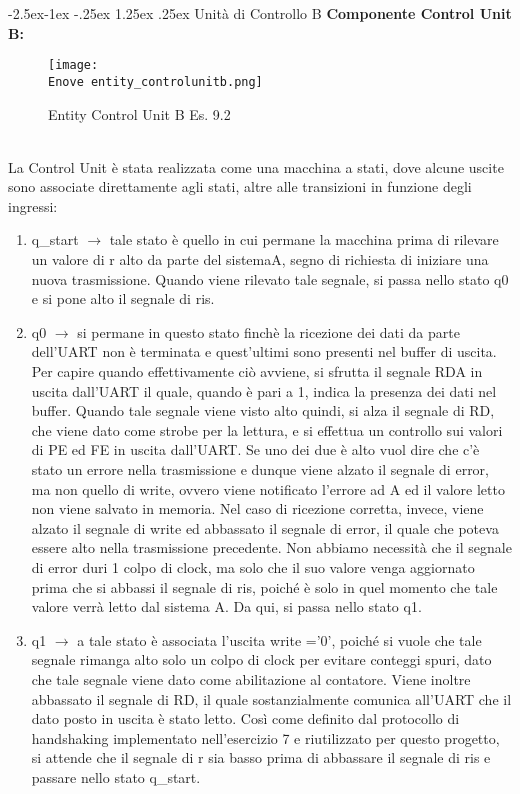 \documentclass[12pt]{article}
\makeatletter
\renewcommand\paragraph{\@startsection{paragraph}{4}{\z@}%
            {-2.5ex\@plus -1ex \@minus -.25ex}%
            {1.25ex \@plus .25ex}%
            {\normalfont\large\bfseries}}
\def \Enove {Allegati/Esercizio9/}
\makeatother
\begin{document}
\paragraph{Unità di Controllo B}
{\large \textbf{Componente Control Unit B:}}
\begin{figure}[ht]
    \centering
    \texttt{[image: \\Enove entity\_controlunitb.png]}
    \caption{Entity Control Unit B Es. 9.2}
\end{figure}
\\La Control Unit è stata realizzata come una macchina a stati, dove alcune uscite sono associate direttamente agli stati, altre alle transizioni in funzione degli ingressi:
\begin{enumerate}
    \item q\_start $\rightarrow$ tale stato è quello in cui permane la macchina prima di rilevare un valore di r alto da parte del sistemaA, segno di richiesta di iniziare una nuova trasmissione. Quando viene rilevato tale segnale, si passa nello stato q0 e si pone alto il segnale di ris.
    \item q0 $\rightarrow$ si permane in questo stato finchè la ricezione dei dati da parte dell’UART non è terminata e quest’ultimi sono presenti nel buffer di uscita. Per capire quando effettivamente ciò avviene, si sfrutta il segnale RDA in uscita dall’UART il quale, quando è pari a 1, indica la presenza dei dati nel buffer. Quando tale segnale viene visto alto quindi, si alza il segnale di RD, che viene dato come strobe per la lettura, e si effettua un controllo sui valori di PE ed FE in uscita dall’UART. Se uno dei due è alto vuol dire che c’è stato un errore nella trasmissione e dunque viene alzato il segnale di error, ma non quello di write, ovvero viene notificato l’errore ad A ed il valore letto non viene salvato in memoria.
          Nel caso di ricezione corretta, invece, viene alzato il segnale di write ed abbassato il segnale di error, il quale che poteva essere alto nella trasmissione precedente. Non abbiamo necessità che il segnale di error duri 1 colpo di clock, ma solo che il suo valore venga aggiornato prima che si abbassi il segnale di ris, poiché è solo in quel momento che tale valore verrà letto dal sistema A.
          Da qui, si passa nello stato q1.
    \item q1 $\rightarrow$  a tale stato è associata l’uscita write =’0’, poiché si vuole che tale segnale rimanga alto solo un colpo di clock per evitare conteggi spuri, dato che tale segnale viene dato come abilitazione al contatore. Viene inoltre abbassato il segnale di RD, il quale sostanzialmente comunica all’UART che il dato posto in uscita è stato letto. Così come definito dal protocollo di handshaking implementato nell’esercizio 7 e riutilizzato per questo progetto, si attende che il segnale di r sia basso prima di abbassare il segnale di ris e passare nello stato q\_start.
\end{enumerate}
\end{document}
